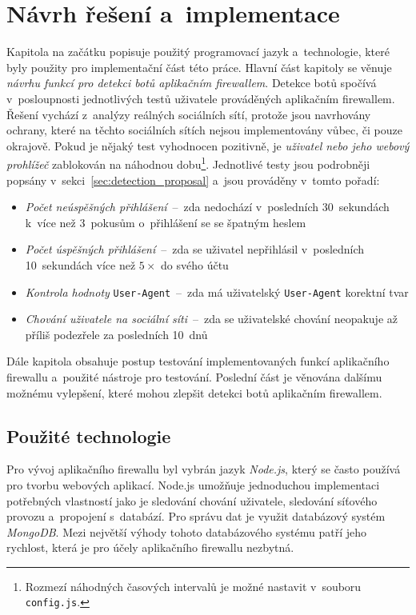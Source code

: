 \chapter{Návrh řešení a~implementace}
\label{chap:proposal_of_solution}
Kapitola na začátku popisuje použitý programovací jazyk a~technologie, které byly použity pro implementační část této práce. Hlavní část kapitoly se věnuje \textit{návrhu funkcí pro detekci botů aplikačním firewallem}. Detekce botů spočívá v~posloupnosti jednotlivých testů uživatele prováděných aplikačním firewallem. Řešení vychází z~analýzy reálných sociálních sítí, protože jsou navrhovány ochrany, které na těchto sociálních sítích nejsou implementovány vůbec, či pouze okrajově. Pokud je nějaký test vyhodnocen pozitivně, je \textit{uživatel nebo jeho webový prohlížeč} zablokován na náhodnou dobu\footnote{Rozmezí náhodných časových intervalů je možné nastavit v~souboru \texttt{config.js}.}. Jednotlivé testy jsou podrobněji popsány v~sekci~\ref{sec:detection_proposal} a~jsou prováděny v~tomto pořadí:

\begin{itemize}
  \item \textit{Počet neúspěšných přihlášení}~--~zda nedochází v~posledních 30~sekundách k~více než 3~pokusům o~přihlášení se se špatným heslem
  \item \textit{Počet úspěšných přihlášení}~--~zda se uživatel nepřihlásil v~posledních 10~sekundách více než $5\times$ do svého účtu
  \item \textit{Kontrola hodnoty} \texttt{User-Agent}~--~zda má uživatelský \texttt{User-Agent} korektní tvar
  \item \textit{Chování uživatele na sociální síti}~--~zda se uživatelské chování neopakuje až příliš podezřele za posledních 10~dnů
\end{itemize}

\noindent
Dále kapitola obsahuje postup testování implementovaných funkcí aplikačního firewallu a~použité nástroje pro testování. Poslední část je věnována dalšímu možnému vylepšení, které mohou zlepšit detekci botů aplikačním firewallem.

\section{Použité technologie}
Pro vývoj aplikačního firewallu byl vybrán jazyk \textit{Node.js}, který se často používá pro tvorbu webových aplikací. Node.js umožňuje jednoduchou implementaci potřebných vlastností jako je sledování chování uživatele, sledování síťového provozu a~propojení s~databází. Pro správu dat je využit databázový systém \textit{MongoDB}. Mezi největší výhody tohoto databázového systému patří jeho rychlost, která je pro účely aplikačního firewallu nezbytná.

